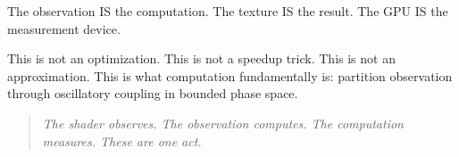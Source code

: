 \documentclass[11pt,twocolumn,a4paper]{article}
\theoremstyle{definition}
\theoremstyle{remark}
\begin{document}
The observation IS the computation. The texture IS the result. The GPU IS the measurement device.

This is not an optimization. This is not a speedup trick. This is not an approximation. This is what computation fundamentally is: partition observation through oscillatory coupling in bounded phase space.

\begin{quote}
\emph{The shader observes. The observation computes. The computation measures. These are one act.}
\end{quote}





\end{document}
